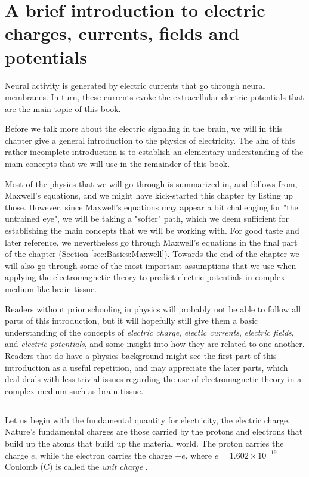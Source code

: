 \chapter{A brief introduction to electric charges, currents, fields and potentials} 
\label{sec:Basics}

Neural activity is generated by electric currents that go through neural membranes. In turn, these currents
evoke the extracellular electric potentials that are the main topic of this book. 

Before we talk more about the electric signaling in the brain, we will in this chapter give a general introduction to the physics of electricity. The aim of this rather incomplete introduction is to establish an elementary understanding of the main concepts that we will use in the remainder of this book. 

Most of the physics that we will go through is summarized in, and follows from, Maxwell's equations, and we might have kick-started this chapter by listing up those. However, since Maxwell's equations may appear a bit challenging for "the untrained eye", we will be taking a "softer" path, which we deem sufficient for establishing the main concepts that we will be working with. For good taste and later reference, we nevertheless go through Maxwell's equations in the final part of the chapter (Section \ref{sec:Basics:Maxwell}). Towards the end of the chapter we will also go through some of the most important assumptions that we use when applying the electromagnetic theory to predict electric potentials in complex medium like brain tissue.

Readers without prior schooling in physics will probably not be able to follow all parts of this introduction, but it will hopefully still give them a basic understanding of the concepts of \textit{electric charge}, \textit{electic currents}, \textit{electric fields}, and \textit{electric potentials}, and some insight into how they are related to one another. Readers that do have a physics background might see the first part of this introduction as a useful repetition, and may appreciate the later parts, which deal deals with less trivial issues regarding the use of electromagnetic theory in a complex medium such as brain tissue. 



\section{}
\label{sec:Basics:Charge} 
Let us begin with the fundamental quantity for electricity, the electric charge. Nature's fundamental charges are those carried by the protons and electrons that build up the atoms that build up the material world. The proton carries the charge $e$, while the electron carries the charge $-e$, where $e = 1.602\times10^{-19}$ Coulomb (\si{\coulomb}) is called the \textit{unit charge} . 

